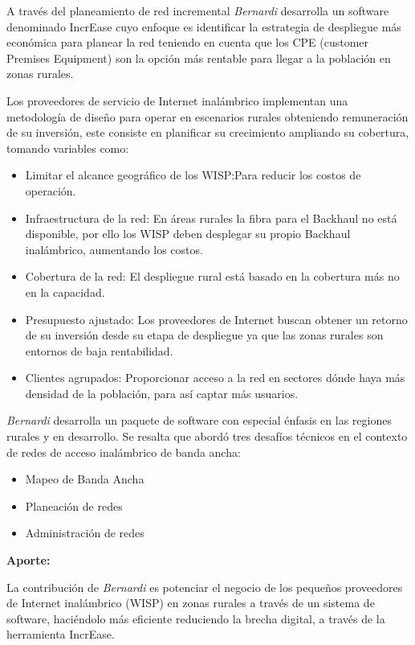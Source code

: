 \documentclass[]{article}
\providecommand{\tightlist}{%
  \setlength{\itemsep}{0pt}\setlength{\parskip}{0pt}}
\begin{document}
A través del planeamiento de red incremental \emph{Bernardi} desarrolla
un software denominado IncrEase cuyo enfoque es identificar la
estrategia de despliegue más económica para planear la red teniendo en
cuenta que los CPE (customer Premises Equipment) son la opción más
rentable para llegar a la población en zonas rurales.

Los proveedores de servicio de Internet inalámbrico implementan una
metodología de diseño para operar en escenarios rurales obteniendo
remuneración de su inversión, este consiste en planificar su crecimiento
ampliando su cobertura, tomando variables como:

\begin{itemize}
\item
  Limitar el alcance geográfico de los WISP:Para reducir los costos de
  operación.
\item
  Infraestructura de la red: En áreas rurales la fibra para el Backhaul
  no está disponible, por ello los WISP deben desplegar su propio
  Backhaul inalámbrico, aumentando los costos.
\item
  Cobertura de la red: El despliegue rural está basado en la cobertura
  más no en la capacidad.
\item
  Presupuesto ajustado: Los proveedores de Internet buscan obtener un
  retorno de su inversión desde su etapa de despliegue ya que las zonas
  rurales son entornos de baja rentabilidad.
\item
  Clientes agrupados: Proporcionar acceso a la red en sectores dónde
  haya más densidad de la población, para así captar más usuarios.
\end{itemize}

\emph{Bernardi} desarrolla un paquete de software con especial énfasis
en las regiones rurales y en desarrollo. Se resalta que abordó tres
desafíos técnicos en el contexto de redes de acceso inalámbrico de banda
ancha:

\begin{itemize}
\tightlist
\item
  Mapeo de Banda Ancha
\item
  Planeación de redes
\item
  Administración de redes
\end{itemize}

\textbf{Aporte:}

La contribución de \emph{Bernardi} es potenciar el negocio de los
pequeños proveedores de Internet inalámbrico (WISP) en zonas rurales a
través de un sistema de software, haciéndolo más eficiente reduciendo la
brecha digital, a través de la herramienta IncrEase.
\end{document}
